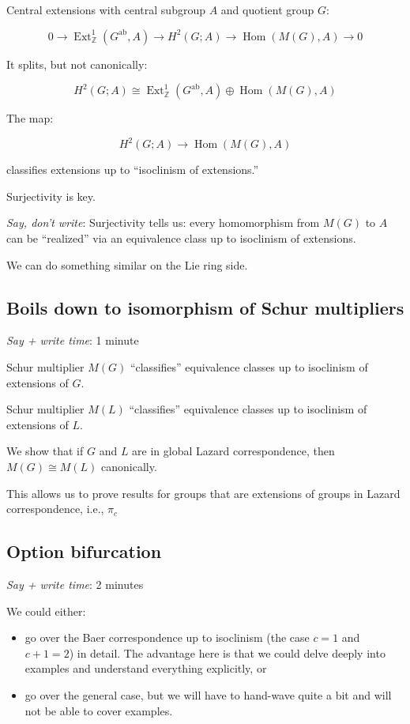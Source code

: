 \documentclass[10pt]{amsart}
\begin{document}
Central extensions with central subgroup $A$ and quotient group $G$:

\begin{equation*}
  0 \to \operatorname{Ext}^1_{\mathbb{Z}}(G^{\operatorname{ab}},A) \to H^2(G;A) \to \operatorname{Hom}(M(G),A) \to 0
\end{equation*}

It splits, but not canonically:

$$H^2(G;A) \cong \operatorname{Ext}^1_{\mathbb{Z}}(G^{\operatorname{ab}},A) \oplus \operatorname{Hom}(M(G),A)$$

The map:

$$H^2(G;A) \to \operatorname{Hom}(M(G),A)$$

classifies extensions up to ``isoclinism of extensions.''

Surjectivity is key.

{\em Say, don't write}: Surjectivity tells us: every homomorphism from
$M(G)$ to $A$ can be ``realized'' via an equivalence class up to
isoclinism of extensions.

We can do something similar on the Lie ring side.

\subsection{Boils down to isomorphism of Schur multipliers}

{\em Say + write time}: 1 minute

Schur multiplier $M(G)$ ``classifies'' equivalence classes up to
isoclinism of extensions of $G$.

Schur multiplier $M(L)$ ``classifies'' equivalence classes up to
isoclinism of extensions of $L$.

We show that if $G$ and $L$ are in global Lazard correspondence, then
$M(G) \cong M(L)$ canonically.

This allows us to prove results for groups that are extensions of
groups in Lazard correspondence, i.e., $\pi_c$ 

\subsection{Option bifurcation}

{\em Say + write time}: 2 minutes

We could either:

\begin{itemize}
\item go over the Baer correspondence up to isoclinism (the case $c =
  1$ and $c + 1 = 2$) in detail. The advantage here is that we could
  delve deeply into examples and understand everything explicitly, or
\item go over the general case, but we will have to hand-wave quite a
  bit and will not be able to cover examples.
\end{itemize}
\end{document}
